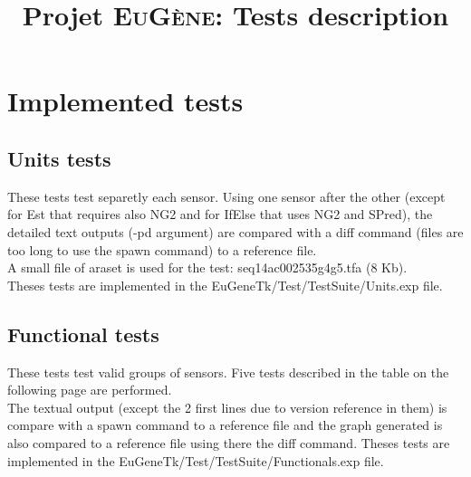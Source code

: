 \documentclass[a4paper,11pt]{article}
\newcommand{\EuGenie}{\textsc{EuG\`ene}}
\begin{document}
\setlength{\parindent}{0pt}

\title{Projet \EuGenie: Tests description}
\maketitle

\section{Implemented tests}

\subsection{Units tests}
These tests test separetly each sensor. Using one sensor after the other (except for Est that requires also NG2 and for IfElse that uses NG2 and SPred), the detailed text outputs (-pd argument) are compared with a diff command (files are too long to use the spawn command) to a reference file.\\
A small file of araset is used for the test: seq14ac002535g4g5.tfa (8 Kb).\\
Theses tests are implemented in the EuGeneTk/Test/TestSuite/Units.exp file.\\

\subsection{Functional tests}
These tests test valid groups of sensors. Five tests described in the table on the following page are performed. \\
The textual output (except the 2 first lines due to version reference in them) is compare with a spawn command to a reference file and the graph generated is also compared to a reference file using there the diff command.  
Theses tests are implemented in the EuGeneTk/Test/TestSuite/Functionals.exp file.
\end{document}
